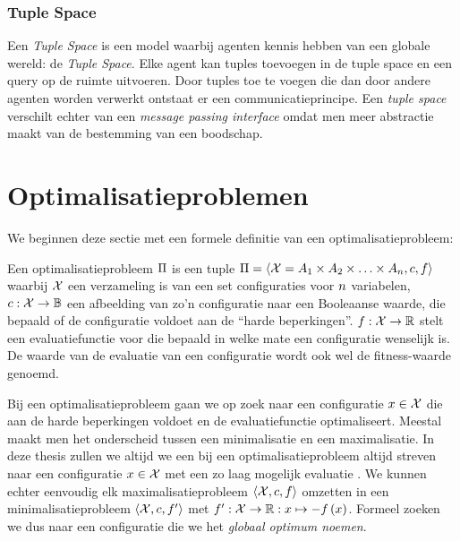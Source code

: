\subsubsection{Tuple Space}

Een \emph{Tuple Space} is een model waarbij agenten kennis hebben van een globale wereld: de \emph{Tuple Space}. Elke agent kan tuples toevoegen in de tuple space en een query op de ruimte uitvoeren. Door tuples toe te voegen die dan door andere agenten worden verwerkt ontstaat er een communicatieprincipe. Een \emph{tuple space} verschilt echter van een \emph{message passing interface} omdat men meer abstractie maakt van de bestemming van een boodschap.

\section{Optimalisatieproblemen}

We beginnen deze sectie met een formele definitie van een optimalisatieprobleem:

\begin{definition}[Optimalisatieprobleem]%
Een optimalisatieprobleem $\Pi$ is een tuple $\Pi=\left\langle \mathcal{X}=A_1\times A_2\times\ldots\times A_{n},c,f\right\rangle$ waarbij $\mathcal{X}$ een verzameling is van een set configuraties voor $n$ variabelen, $c:\mathcal{X}\rightarrow \mathbb{B}$ een afbeelding van zo'n configuratie naar een Booleaanse waarde, die bepaald of de configuratie voldoet aan de ``harde beperkingen''. $f:\mathcal{X}\rightarrow \mathbb{R}$ stelt een evaluatiefunctie voor die bepaald in welke mate een configuratie wenselijk is. De waarde van de evaluatie van een configuratie  wordt ook wel de fitness-waarde genoemd.
\end{definition}
Bij een optimalisatieprobleem gaan we op zoek naar een configuratie $x\in\mathcal{X}$ die aan de harde beperkingen voldoet en de evaluatiefunctie optimaliseert. Meestal maakt men het onderscheid tussen een minimalisatie en een maximalisatie. In deze thesis zullen we altijd we een bij een optimalisatieprobleem altijd streven naar een configuratie $x\in\mathcal{X}$ met een zo laag mogelijk evaluatie . We kunnen echter eenvoudig elk maximalisatieprobleem $\left\langle \mathcal{X},c,f\right\rangle$ omzetten in een minimalisatieprobleem $\left\langle \mathcal{X},c,f'\right\rangle$ met $f':\mathcal{X}\rightarrow \mathbb{R}:x\mapsto -f\left(x\right)$. Formeel zoeken we dus naar een configuratie \xstar{} die we het \emph{globaal optimum noemen}.


